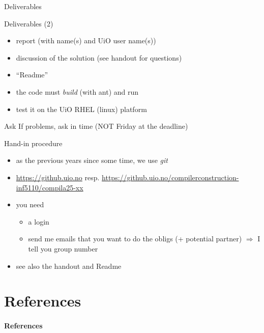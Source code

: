 \documentclass{beamer}
\begin{document}
\begin{frame}[label={sec:org377b679}]{Deliverables}
\begin{block}{Deliverables (2)}
\begin{itemize}
\item report (with name(s) and UiO user name(s))
\item discussion of the solution (see handout for questions)
\end{itemize}

\begin{itemize}
\item ``Readme''
\end{itemize}
\end{block}
\begin{itemize}
\item the code must \emph{build} (with ant) and run
\item test it on the  UiO RHEL (linux) platform
\end{itemize}
\begin{block}{Ask}
If problems, \alert{ask in time}  (\alert{NOT} Friday at the deadline)
\end{block}
\end{frame}
\begin{frame}[label={sec:org6542c19}]{Hand-in procedure}
\begin{itemize}
\item as the previous years since some time, we use  \emph{git}

\item \url{https://github.uio.no} resp.
\href{https://github.uio.no/compilerconstruction-inf5110/compila}{https://github.uio.no/compilerconstruction-inf5110/compila25-xx}

\item you need

\begin{itemize}
\item a login
\item send me emails that you want to do the obligs (+ potential partner)
\(\Rightarrow\) I tell you group number
\end{itemize}
\end{itemize}


\begin{itemize}
\item see also the \alert{handout} and \alert{Readme}
\end{itemize}
\end{frame}
\chapter{References}
\label{sec:orge1647ef}

\begin{frame}[allowframebreaks]
  \frametitle{References}
  {\tiny
    
%     
  }
\end{frame}

\end{document}
